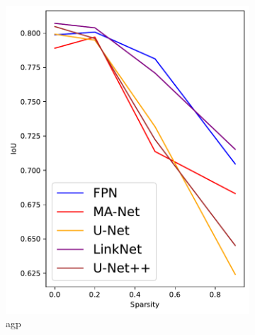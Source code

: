 \documentclass[mathematics,article,submit,pdftex,moreauthors]{Definitions/mdpi}
\begin{document}
\begin{figure}[!ht]
    \centering
      \begin{subfigure}[t]{.294\textwidth}
        \centering
        \includegraphics[width=.95\linewidth]{figures/test/pruning-testing-score_CCSC_agp.pdf}
        \caption{\ac{agp}}
        \label{fig:results:test:sscs:agp}
      \end{subfigure}
      \hfill
      \begin{subfigure}[t]{.284\textwidth}
        \centering

\end{subfigure}
\end{figure}
\end{document}
